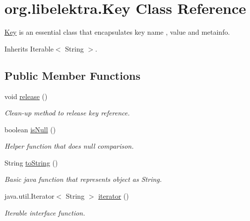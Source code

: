 \hypertarget{classorg_1_1libelektra_1_1Key}{}\section{org.\+libelektra.\+Key Class Reference}
\label{classorg_1_1libelektra_1_1Key}


\hyperlink{classorg_1_1libelektra_1_1Key}{Key} is an essential class that encapsulates key name , value and metainfo.  




Inherits Iterable$<$ String $>$.

\subsection*{Public Member Functions}
\begin{DoxyCompactItemize}
\item 
\mbox{\label{classorg_1_1libelektra_1_1Key_a8e93661372c9a6d5d23a056265a6f5a5}} 
void \hyperlink{classorg_1_1libelektra_1_1Key_a8e93661372c9a6d5d23a056265a6f5a5}{release} ()
\begin{DoxyCompactList}\small\item\em Clean-\/up method to release key reference. \end{DoxyCompactList}\item 
boolean \hyperlink{classorg_1_1libelektra_1_1Key_adfcebdd407d050b0626a8f2cfec00e8b}{is\+Null} ()
\begin{DoxyCompactList}\small\item\em Helper function that does null comparison. \end{DoxyCompactList}\item 
String \hyperlink{classorg_1_1libelektra_1_1Key_a2814202c93e4f4dac842b2d4856ba78e}{to\+String} ()
\begin{DoxyCompactList}\small\item\em Basic java function that represents object as String. \end{DoxyCompactList}\item 
java.\+util.\+Iterator$<$ String $>$ \hyperlink{classorg_1_1libelektra_1_1Key_ad948a4ab2d5142b439830ddc5c16cc38}{iterator} ()
\begin{DoxyCompactList}\small\item\em Iterable interface function. \end{DoxyCompactList}\item 

\end{DoxyCompactItemize}
